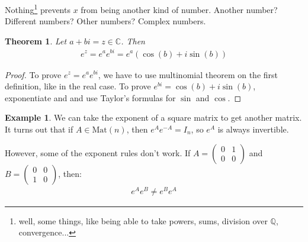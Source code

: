 \documentclass[12pt,a4paper]{amsart}
\newtheorem*{Theorem}                    {Theorem}
\theoremstyle{definition}
\newtheorem{Example}{Example}
\theoremstyle{remark}
\def \C{\mathbb{C}}
\def \Q{\mathbb{Q}}
\begin{document}
Nothing\footnote{well, some things, like being able to take powers, sums, 
division over $\Q$, convergence...} 
prevents $x$ from being another kind of number. 
Another number? Different numbers? Other numbers? Complex numbers.
\begin{Theorem}
  Let $a+bi=z\in \C$. Then
  \begin{align*}
    e^z = e^ae^{bi}=e^a(\cos(b)+i\sin(b))
  \end{align*}
\end{Theorem}
\begin{proof}
  To prove $e^z=e^ae^{bi}$, we have to use multinomial theorem 
  on the first definition, like in the real case. To 
  prove $e^{bi}=\cos(b)+i\sin(b)$, exponentiate and 
  and use Taylor's formulas for $\sin$ and $\cos$.
\end{proof}
\begin{Example}
  We can take the exponent of a square matrix to get another 
  matrix. \\
  It turns out that if $A\in \text{Mat}(n)$, then $e^Ae^{-A} = I_n$, so 
  $e^A$ is always invertible. 
\end{Example}
However, some of the exponent rules don't work. If
$A = \left(\begin{smallmatrix}0&1\\0&0\end{smallmatrix}\right)$ 
and $B =\left(\begin{smallmatrix}0&0\\1&0\end{smallmatrix}\right)$, 
then:
\begin{align*}
 e^Ae^B\neq e^B e^A
 \end{align*}
\newpage
\end{document}
